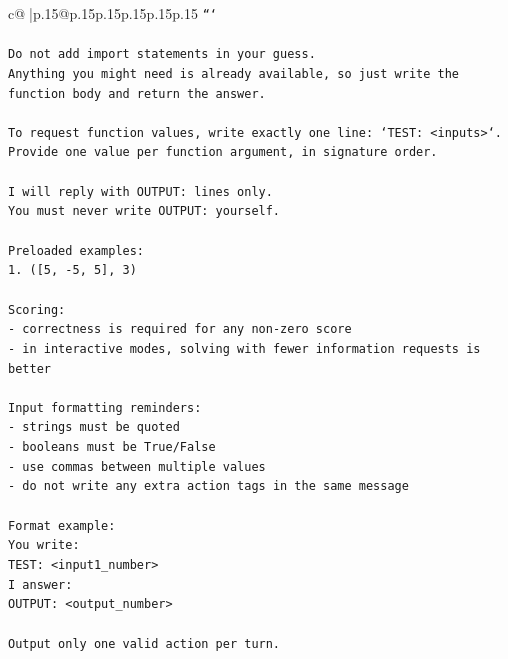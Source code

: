 \documentclass{article}
\begin{document}
{\begin{supertabular}{c@{$\;$}|p{.15\linewidth}@{}p{.15\linewidth}p{.15\linewidth}p{.15\linewidth}p{.15\linewidth}p{.15\linewidth}}
{{{\texttt{```} \\
\\ 
\texttt{Do not add import statements in your guess.} \\
\texttt{Anything you might need is already available, so just write the function body and return the answer.} \\
\\ 
\texttt{To request function values, write exactly one line: `TEST: <inputs>`.} \\
\texttt{Provide one value per function argument, in signature order.} \\
\\ 
\texttt{I will reply with OUTPUT: lines only.} \\
\texttt{You must never write OUTPUT: yourself.} \\
\\ 
\texttt{Preloaded examples:} \\
\texttt{1. ({[}5, {-}5, 5{]}, 3)} \\
\\ 
\texttt{Scoring:} \\
\texttt{{-} correctness is required for any non{-}zero score} \\
\texttt{{-} in interactive modes, solving with fewer information requests is better} \\
\\ 
\texttt{Input formatting reminders:} \\
\texttt{{-} strings must be quoted} \\
\texttt{{-} booleans must be True/False} \\
\texttt{{-} use commas between multiple values} \\
\texttt{{-} do not write any extra action tags in the same message} \\
\\ 
\texttt{Format example:} \\
\texttt{You write:} \\
\texttt{TEST: <input1\_number>} \\
\texttt{I answer:} \\
\texttt{OUTPUT: <output\_number>} \\
\\ 
\texttt{Output only one valid action per turn.} \\
            }
        }
    }
     \\ \\


\end{supertabular}}
\end{document}
